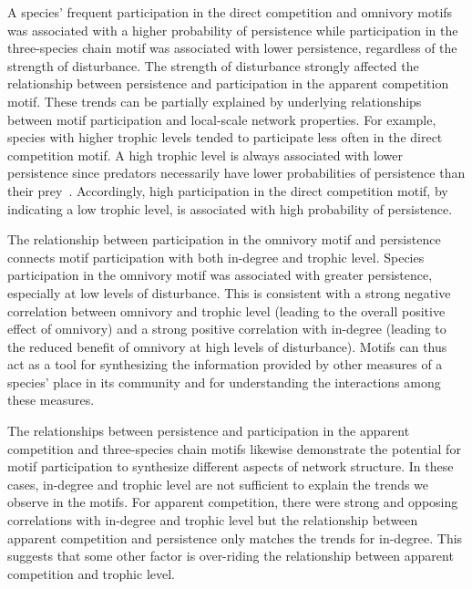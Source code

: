 \documentclass[12pt]{article}
\begin{document}
\begin{spacing}{2.0}
    
    A species' frequent participation in the direct competition and omnivory motifs was associated with a higher probability of persistence while participation in the three-species chain motif was associated with lower persistence, regardless of the strength of disturbance.
    The strength of disturbance strongly affected the relationship between persistence and participation in the apparent competition motif.
    These trends can be partially explained by underlying relationships between motif participation and local-scale network properties.
    For example, species with higher trophic levels tended to participate less often in the direct competition motif.
    A high trophic level is always associated with lower persistence since predators necessarily have lower probabilities of persistence than their prey~\citep{Eklof2013}.
    Accordingly, high participation in the direct competition motif, by indicating a low trophic level, is associated with high probability of persistence.
    
    
    The relationship between participation in the omnivory motif and persistence connects motif participation with both in-degree and trophic level.
    Species participation in the omnivory motif was associated with greater persistence, especially at low levels of disturbance.
    This is consistent with a strong negative correlation between omnivory and trophic level (leading to the overall positive effect of omnivory) and a strong positive correlation with in-degree (leading to the reduced benefit of omnivory at high levels of disturbance). 
    Motifs can thus act as a tool for synthesizing the information provided by other measures of a species' place in its community and for understanding the interactions among these measures.
    
    
    The relationships between persistence and participation in the apparent competition and three-species chain motifs likewise demonstrate the potential for motif participation to synthesize different aspects of network structure.
    In these cases, in-degree and trophic level are not sufficient to explain the trends we observe in the motifs.
    For apparent competition, there were strong and opposing correlations with in-degree and trophic level but the relationship between apparent competition and persistence only matches the trends for in-degree.
    This suggests that some other factor is over-riding the relationship between apparent competition and trophic level.
    

\end{spacing}
\end{document}
